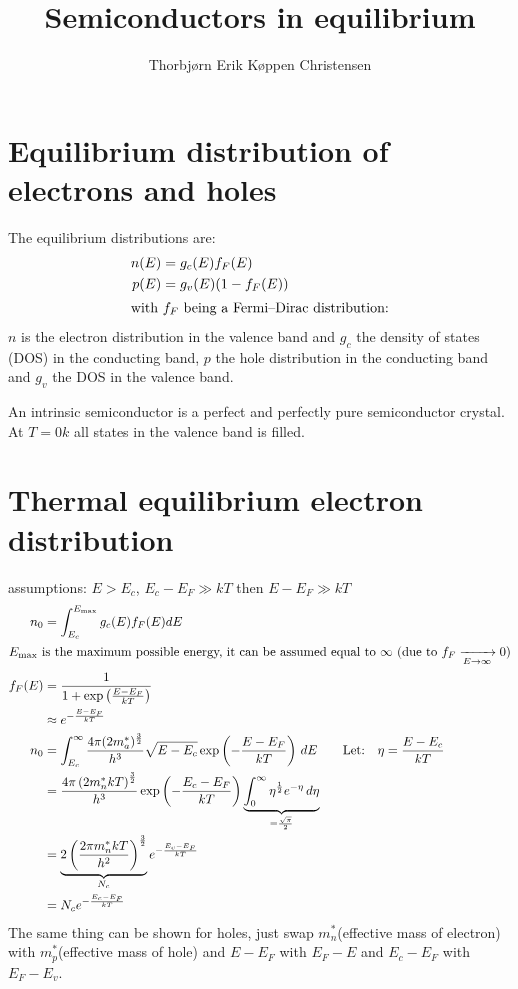\documentclass[article,oneside]{memoir}
\title{Semiconductors in equilibrium}
\author{Thorbjørn Erik Køppen Christensen}
\begin{document}
\maketitle
\chapter{Equilibrium distribution of electrons and holes}
The equilibrium distributions are:
\begin{align*}
        n(E)&=g_c(E)f_{F}(E)\\
        p(E)&=g_v(E)(1-f_F(E))\\
        \intertext{with $f_F$ being a Fermi--Dirac distribution:}
\end{align*}
$n$ is the electron distribution in the valence band and $g_c$ the density of states (DOS) in the conducting band, $p$ the hole distribution in the conducting band and $g_v$ the DOS in the valence band.

An intrinsic semiconductor is a perfect and perfectly pure semiconductor crystal. At $T=0k$ all states in the valence band is filled.

\chapter{Thermal equilibrium electron distribution}
assumptions: $E>E_{c}$, $E_c-E_F\gg kT$ then $E-E_F \gg kT$
\begin{align*}
        n_0&=\int_{E_c}^{E_{\textup{max}}}g_c(E)f_F(E)dE\\
        \intertext{$E_{\textup{max}}$ is the maximum possible energy, it can be assumed equal to $\infty$ (due to $f_F\xrightarrow[E\rightarrow\infty]{}0$)}
        f_{F}(E)&=\frac{1}{1+\exp\left( \frac{E-E_{F}}{kT} \right)}\\
        &\approx e^{-\frac{E-E_F}{kT}}\\
        n_0&=\int_{E_c}^{\infty}\frac{4\pi(2m_a^*)^{\frac{3}{2}}}{h^3}\sqrt{E-E_c}\exp\left( -\frac{E-E_F}{kT} \right)\,dE\qquad\textup{Let:}\quad\eta=\frac{E-E_c}{kT}\\
        &=\frac{4\pi\left( 2m_{n}^{*}kT \right)^{\frac{3}{2}}}{h^3}\exp\left( -\frac{E_c-E_F}{kT} \right)\underbrace{\int_0^{\infty}\eta^{\frac{1}{2}}e^{-\eta}\,d\eta }_{=\frac{\sqrt{\pi}}{2}}\\
        &=\underbrace{2\left( \frac{2\pi m_{n}^*kT}{h^2} \right)^{\frac{3}{2}}}_{N_c}e^{-\frac{E_c-E_F}{kT}}\\
        &=N_ce^{-\frac{E_c-E_F}{kT}}
\end{align*}
The same thing can be shown for holes, just swap $m_n^*$(effective mass of electron) with $m_p^*$(effective mass of hole) and $E-E_F$ with $E_F-E$ and $E_c-E_F$ with $E_F-E_v$.
\end{document}
